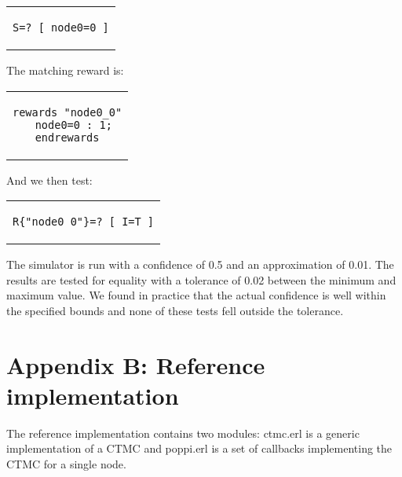 \documentclass[a4paper,10pt]{article}
\newcommand{\code}[1]{
  \footnotesize
  
}
\newenvironment{prismprop}[0]{
  \begin{center}
  \begin{tabular}{c}
  \footnotesize
}{
  \end{tabular}
  \end{center}
}
\begin{document}
\begin{prismprop}
\begin{lstlisting}
S=? [ node0=0 ]
\end{lstlisting}
\end{prismprop}

\noindent The matching reward is:

\begin{prismprop}
\begin{lstlisting}
rewards "node0_0"
  node0=0 : 1;
endrewards
\end{lstlisting}
\end{prismprop}

\noindent And we then test:

\begin{prismprop}
\begin{lstlisting}
R{"node0_0"}=? [ I=T ]
\end{lstlisting}
\end{prismprop}

The simulator is run with a confidence of 0.5 and an approximation of 0.01. The results are tested for equality with a tolerance of 0.02 between the minimum and maximum value. We found in practice that the actual confidence is well within the specified bounds and none of these tests fell outside the tolerance.

\clearpage

\section*{Appendix B: Reference implementation}

The reference implementation contains two modules: ctmc.erl is a generic implementation of a CTMC and poppi.erl is a set of callbacks implementing the CTMC for a single node.

\clearpage
\code{../src/ctmc.erl}
\clearpage
\code{../src/poppi.erl}
\end{document}
